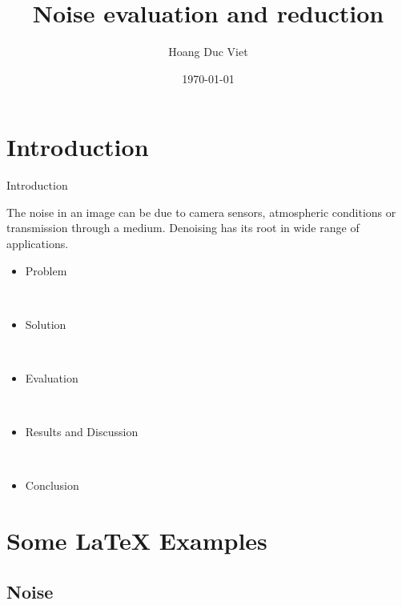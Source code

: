 \documentclass{beamer}
\title[Your Short Title]{Noise evaluation and reduction}
\author{Hoang Duc Viet}
\institute{ICT Lab}
\date{\today}
\begin{document}
\begin{frame}
  \titlepage
\end{frame}


\section{Introduction}

\begin{frame}{Introduction}

The noise in an image can be due to camera sensors, atmospheric conditions or transmission through a medium. Denoising has its root in wide range of applications. %
\vspace{1cm} 
\begin{itemize}
  \item Problem
  
  \
  
  \item Solution
  
  \
  
  \item Evaluation
  
  \
  
  \item Results and Discussion

\
 
  \item Conclusion
\end{itemize}



\end{frame}

\section{Some \LaTeX{} Examples}

\subsection{Noise}
\end{document}
